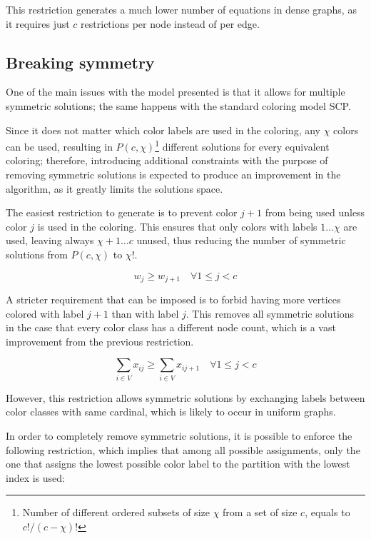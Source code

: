 This restriction generates a much lower number of equations in dense graphs, as it requires just $c$ restrictions per node instead of per edge.

\subsection{Breaking symmetry}
\label{subsec:model:symmetry}

One of the main issues with the model presented is that it allows for multiple symmetric solutions; the same happens with the standard coloring model SCP. 

Since it does not matter which color labels are used in the coloring, any $\chi$ colors can be used, resulting in $P(c,\chi)$\footnote{Number of different ordered subsets of size $\chi$ from a set of size $c$, equals to $c! / (c - \chi)!$} different solutions for every equivalent coloring; therefore, introducing additional constraints with the purpose of removing symmetric solutions is expected to produce an improvement in the algorithm, as it greatly limits the solutions space.

The easiest restriction to generate is to prevent color $j+1$ from being used unless color $j$ is used in the coloring. This ensures that only colors with labels $1 \ldots \chi$ are used, leaving always $\chi+1 \ldots c$ unused, thus reducing the number of symmetric solutions from $P(c,\chi)$ to $\chi!$.

\begin{equation}
\label{eqn:lowerlabel}
w_j \geq w_{j+1} \quad \forall 1 \leq j < c 
\end{equation}

A stricter requirement that can be imposed is to forbid having more vertices colored with label $j+1$ than with label $j$. This removes all symmetric solutions in the case that every color class has a different node count, which is a vast improvement from the previous restriction.

\begin{equation}
\label{eqn:symnodecount}
\sum_{i \in V} x_{ij} \geq \sum_{i \in V} x_{ij+1} \quad \forall 1 \leq j < c 
\end{equation}

However, this restriction allows symmetric solutions by exchanging labels between color classes with same cardinal, which is likely to occur in uniform graphs. 

In order to completely remove symmetric solutions, it is possible to enforce the following restriction, which implies that among all possible assignments, only the one that assigns the lowest possible color label to the partition with the lowest index is used: 

